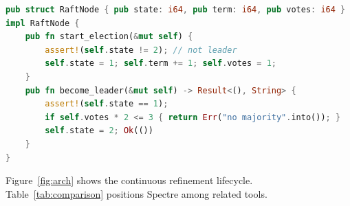 \documentclass[runningheads]{../paper-vmcai-2027/llncs}
\begin{document}
\begin{lstlisting}[language=Rust,
  caption={Raft node in Rust (8 methods, 9 \texttt{assert!} guards; 30 LOC).},
  label={lst:raft-rust}]
pub struct RaftNode { pub state: i64, pub term: i64, pub votes: i64 }
impl RaftNode {
    pub fn start_election(&mut self) {
        assert!(self.state != 2); // not leader
        self.state = 1; self.term += 1; self.votes = 1;
    }
    pub fn become_leader(&mut self) -> Result<(), String> {
        assert!(self.state == 1);
        if self.votes * 2 <= 3 { return Err("no majority".into()); }
        self.state = 2; Ok(())
    }
}
\end{lstlisting}

Figure~\ref{fig:arch} shows the continuous refinement lifecycle.
Table~\ref{tab:comparison} positions Spectre among related tools.
\end{document}
